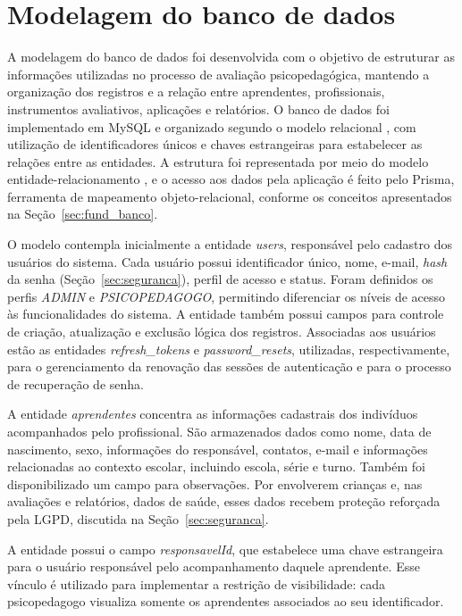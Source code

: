 \section{Modelagem do banco de dados}\label{sec:modelagem}

A modelagem do banco de dados foi desenvolvida com o objetivo de estruturar as informações utilizadas no processo de avaliação psicopedagógica, mantendo a organização dos registros e a relação entre aprendentes, profissionais, instrumentos avaliativos, aplicações e relatórios. O banco de dados foi implementado em MySQL e organizado segundo o modelo relacional \cite{codd1970_relational}, com utilização de identificadores únicos e chaves estrangeiras para estabelecer as relações entre as entidades. A estrutura foi representada por meio do modelo entidade-relacionamento \cite{chen1976_entity_relationship}, e o acesso aos dados pela aplicação é feito pelo Prisma, ferramenta de mapeamento objeto-relacional, conforme os conceitos apresentados na Seção~\ref{sec:fund_banco}.

O modelo contempla inicialmente a entidade \textit{users}, responsável pelo cadastro dos usuários do sistema. Cada usuário possui identificador único, nome, e-mail, \textit{hash} da senha (Seção~\ref{sec:seguranca}), perfil de acesso e status. Foram definidos os perfis \textit{ADMIN} e \textit{PSICOPEDAGOGO}, permitindo diferenciar os níveis de acesso às funcionalidades do sistema. A entidade também possui campos para controle de criação, atualização e exclusão lógica dos registros. Associadas aos usuários estão as entidades \textit{refresh\_tokens} e \textit{password\_resets}, utilizadas, respectivamente, para o gerenciamento da renovação das sessões de autenticação e para o processo de recuperação de senha.

A entidade \textit{aprendentes} concentra as informações cadastrais dos indivíduos acompanhados pelo profissional. São armazenados dados como nome, data de nascimento, sexo, informações do responsável, contatos, e-mail e informações relacionadas ao contexto escolar, incluindo escola, série e turno. Também foi disponibilizado um campo para observações. Por envolverem crianças e, nas avaliações e relatórios, dados de saúde, esses dados recebem proteção reforçada pela LGPD, discutida na Seção~\ref{sec:seguranca}.

A entidade possui o campo \textit{responsavelId}, que estabelece uma chave estrangeira para o usuário responsável pelo acompanhamento daquele aprendente. Esse vínculo é utilizado para implementar a restrição de visibilidade: cada psicopedagogo visualiza somente os aprendentes associados ao seu identificador.

